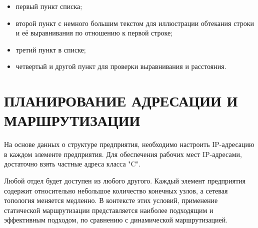 \documentclass[14pt, a4paper]{extarticle}
\numberwithin{equation}{section}
\begin{document}
\begin{itemize}
    \item первый пункт списка;
    \item второй пункт с немного большим текстом для иллюстрации обтекания строки и её выравнивания по отношению к первой строке;
    \item третий пункт в списке;
    \item четвертый и другой пункт для проверки выравнивания и расстояния.
\end{itemize}

\section[ПЛАНИРОВАНИЕ АДРЕСАЦИИ И МАРШРУТИЗАЦИИ]{ПЛАНИРОВАНИЕ АДРЕСАЦИИ И \\ МАРШРУТИЗАЦИИ}
На основе данных о структуре предприятия,
необходимо настроить IP-адресацию в каждом элементе
предприятия. Для обеспечения рабочих мест IP-адресами, достаточно взять частные адреса класса "C".


Любой отдел будет доступен из любого другого.
Каждый элемент предприятия содержит относительно небольшое количество конечных узлов, 
а сетевая топология меняется медленно. В контексте этих условий, применение 
статической маршрутизации представляется наиболее подходящим и эффективным подходом, 
по сравнению с динамической маршрутизацией.\cite{habr-routing}
\end{document}
